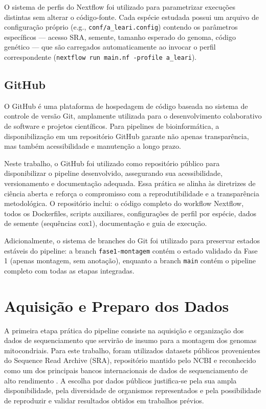 O sistema de perfis do Nextflow foi utilizado para parametrizar execuções distintas sem alterar o código-fonte. Cada espécie estudada possui um arquivo de configuração próprio (e.g., \texttt{conf/a\_leari.config}) contendo os parâmetros específicos --- acesso SRA, semente, tamanho esperado do genoma, código genético --- que são carregados automaticamente ao invocar o perfil correspondente (\texttt{nextflow run main.nf -profile a\_leari}).

\subsection{GitHub}

O GitHub é uma plataforma de hospedagem de código baseada no sistema de controle de versão Git, amplamente utilizada para o desenvolvimento colaborativo de software e projetos científicos. Para pipelines de bioinformática, a disponibilização em um repositório GitHub garante não apenas transparência, mas também acessibilidade e manutenção a longo prazo.

Neste trabalho, o GitHub foi utilizado como repositório público para disponibilizar o pipeline desenvolvido, assegurando sua acessibilidade, versionamento e documentação adequada. Essa prática se alinha às diretrizes de ciência aberta e reforça o compromisso com a reprodutibilidade e a transparência metodológica. O repositório inclui: o código completo do workflow Nextflow, todos os Dockerfiles, scripts auxiliares, configurações de perfil por espécie, dados de semente (sequências cox1), documentação e guia de execução.

Adicionalmente, o sistema de branches do Git foi utilizado para preservar estados estáveis do pipeline: a branch \texttt{fase1-montagem} contém o estado validado da Fase 1 (apenas montagem, sem anotação), enquanto a branch \texttt{main} contém o pipeline completo com todas as etapas integradas.

\section{Aquisição e Preparo dos Dados}

A primeira etapa prática do pipeline consiste na aquisição e organização dos dados de sequenciamento que servirão de insumo para a montagem dos genomas mitocondriais. Para este trabalho, foram utilizados datasets públicos provenientes do Sequence Read Archive (SRA), repositório mantido pelo NCBI e reconhecido como um dos principais bancos internacionais de dados de sequenciamento de alto rendimento \cite{leinonen2011}. A escolha por dados públicos justifica-se pela sua ampla disponibilidade, pela diversidade de organismos representados e pela possibilidade de reproduzir e validar resultados obtidos em trabalhos prévios.

